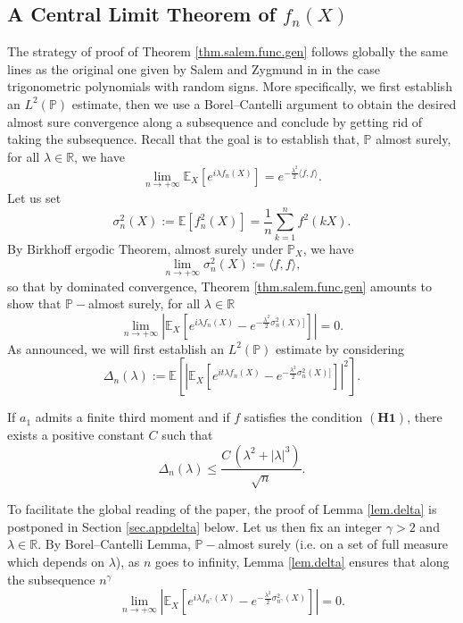 \documentclass{svproc}
\newcommand{\Prob}{\mathbb{P}}
\newcommand \Esp {\mathbb{E}}
\begin{document}
\subsection{A Central Limit Theorem of $f_n(X)$} \label{sec.dim1}
The strategy of proof of Theorem \ref{thm.salem.func.gen} follows globally the same lines as the original one given by Salem and Zygmund in \cite{SZ54} in the case trigonometric polynomials with random signs. 
More specifically, we first establish an $L^2(\Prob)$ estimate, then we use a Borel--Cantelli argument to obtain the desired almost sure convergence along a subsequence and conclude by getting rid of taking the subsequence.
Recall that the goal is to establish that, $\mathbb P$ almost surely, for all ${\lambda} \in \mathbb R$, we have 
\[
\lim_{n \to +\infty} \Esp_X\left[e^{i {\lambda} f_n(X)} \right]= e^{-\frac{{\lambda}^2}{2} \langle f,f\rangle}.
\]
Let us set
\[
\sigma_n^{2}(X):=\Esp\left[f_n^{2}(X)\right]=\frac{1}{n} \sum_{k=1}^n f^2(k X).
\]
By Birkhoff ergodic Theorem, almost surely under $\mathbb P_X$, we have 
\[
\lim_{n \to+\infty} \sigma_n^{2}(X):=\langle f,f\rangle,
\]
so that by dominated convergence, Theorem \ref{thm.salem.func.gen} amounts to show that $\mathbb P-$almost surely, for all ${\lambda} \in \mathbb R$
\[
\lim_{n \to +\infty} \left|\Esp_X\left[e^{i {\lambda} f_n(X)}-e^{-\frac{{\lambda}^2}{2}\sigma_n^2(X)]}\right]\right|=0.
\]
As announced, we will first establish an $L^2(\mathbb P)$ estimate by considering
\[
\Delta_n({\lambda}):=\Esp\left[ \left|\Esp_X\left[e^{it {\lambda}f_n(X)}-e^{-\frac{{\lambda}^2}{2}\sigma_n^2(X)]}\right]\right|^2\right].
\]
\begin{lemma}\label{lem.delta}
If $a_1$ admits a finite third moment and if $f$ satisfies the condition $\mathbf{(H1)}$, there exists a positive constant $C$ such that 
\[
\Delta_n({\lambda}) \leq \frac{C \,({\lambda}^2+ |{\lambda}|^3)}{\sqrt{n}}.
\]
\end{lemma}
To facilitate the global reading of the paper, the proof of Lemma \ref{lem.delta} is postponed in Section \ref{sec.appdelta} below. 
Let us then fix an integer $\gamma>2$ and ${\lambda} \in \mathbb R$. By Borel--Cantelli Lemma, $\Prob-$almost surely (i.e. on a set of full measure which depends on ${\lambda}$), as $n$ goes to infinity, Lemma \ref{lem.delta} ensures that along the subsequence $n^{\gamma}$
\begin{equation}\label{eq.convpsBC}
\lim_{n\to+\infty}\left| \Esp_X\left[e^{i {\lambda} f_{n^{\gamma}}(X)}-e^{-\frac{{\lambda}^2}{2}\sigma_{n^{\gamma}}^{2}(X)} \right]\right| =0.
\end{equation}
\end{document}
